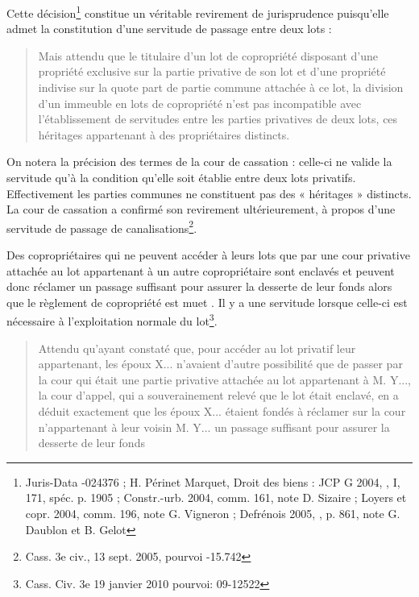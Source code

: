 			Cette décision\footnote{Juris-Data -024376 ; H. Périnet Marquet, Droit des biens : JCP G 2004, , I, 171, spéc. p. 1905 ; Constr.-urb. 2004,	comm. 161, note D. Sizaire ; Loyers et copr. 2004, comm. 196, note G. Vigneron ; Defrénois 2005, , p. 861, note G. Daublon et	B. Gelot} constitue un véritable revirement de jurisprudence puisqu’elle admet la constitution d’une servitude de passage entre deux lots :
			\begin{quote}
				Mais attendu que le titulaire d'un lot de copropriété disposant d'une propriété exclusive sur
				la partie privative de son lot et d'une propriété indivise sur la quote part de partie commune
				attachée à ce lot, la division d'un immeuble en lots de copropriété n'est pas incompatible
				avec l'établissement de servitudes entre les parties privatives de deux lots, ces héritages
				appartenant à des propriétaires distincts.
			\end{quote}
			
			On notera la précision des termes de la cour de cassation : celle-ci ne valide la servitude qu’à la condition
			qu’elle soit établie entre deux lots privatifs. Effectivement les parties communes ne constituent pas des
			« héritages » distincts. La cour de cassation a confirmé son revirement ultérieurement, à propos d’une
			servitude de passage de canalisations\footnote{Cass. 3e civ., 13 sept. 2005, pourvoi -15.742}.
			
			Des copropriétaires qui ne peuvent accéder à leurs lots que par une cour privative attachée au lot
			appartenant à un autre copropriétaire sont enclavés et peuvent donc réclamer un passage suffisant pour
			assurer la desserte de leur fonds alors que le règlement de copropriété est muet . Il y a une servitude
			lorsque celle-ci est nécessaire à l’exploitation normale du lot\footnote{Cass. Civ. 3e 19 janvier 2010 pourvoi: 09-12522}.
			\begin{quote}
				Attendu qu'ayant constaté que, pour accéder au lot privatif  leur appartenant, les époux X...
				n'avaient d'autre possibilité que de passer par la cour  qui était une partie privative attachée
				au lot  appartenant à M. Y..., la cour d'appel, qui a souverainement relevé que le lot 
				était enclavé, en a déduit exactement que les époux X... étaient fondés à réclamer sur la cour n'appartenant à leur voisin M. Y... un passage suffisant pour assurer la desserte de leur fonds
			\end{quote}



